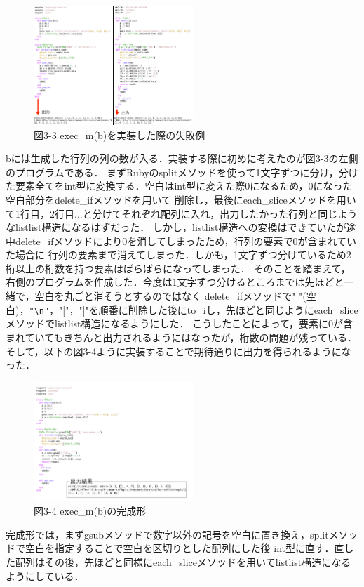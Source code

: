 \begin{figure}[htbp]\begin{center}
\includegraphics[width=6cm,bb=0 0 442 500]{../figs/./mapleruby_eringi.005.png}
\caption{図3-3 exec\_m(b)を実装した際の失敗例}
\label{default}\end{center}\end{figure}
bには生成した行列の列の数が入る．実装する際に初めに考えたのが図3-3の左側のプログラムである．
まずRubyのsplitメソッドを使って1文字ずつに分け，分けた要素全てをint型に変換する．空白はint型に変えた際0になるため，0になった空白部分をdelete\_ifメソッドを用いて
削除し，最後にeach\_sliceメソッドを用いて1行目，2行目...と分けてそれぞれ配列に入れ，出力したかった行列と同じようなlistlist構造になるはずだった．
しかし，listlist構造への変換はできていたが途中delete\_ifメソッドにより0を消してしまったため，行列の要素で0が含まれていた場合に
行列の要素まで消えてしまった．しかも，1文字ずつ分けているため2桁以上の桁数を持つ要素はばらばらになってしまった．
そのことを踏まえて，右側のプログラムを作成した．今度は1文字ずつ分けるところまでは先ほどと一緒で，空白を丸ごと消そうとするのではなく
delete\_ifメソッドで" "(空白)，\verb|"\n"|，"["，"]"を順番に削除した後にto\_iし，先ほどと同じようにeach\_sliceメソッドでlistlist構造になるようにした．
こうしたことによって，要素に0が含まれていてもきちんと出力されるようにはなったが，桁数の問題が残っている．
そして，以下の図3-4ように実装することで期待通りに出力を得られるようになった．

\begin{figure}[htbp]\begin{center}
\includegraphics[width=6cm,bb=0 0 442 500]{../figs/./mapleruby_eringi.006.png}
\caption{図3-4 exec\_m(b)の完成形}
\label{default}\end{center}\end{figure}
完成形では，まずgsubメソッドで数字以外の記号を空白に置き換え，splitメソッドで空白を指定することで空白を区切りとした配列にした後
int型に直す．直した配列はその後，先ほどと同様にeach\_sliceメソッドを用いてlistlist構造になるようにしている．

